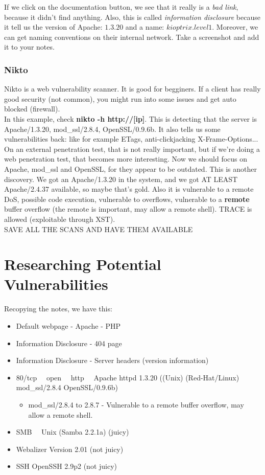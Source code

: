\documentclass[11pt,a4paper]{article}
\begin{document}
If we click on the documentation button, we see that it really is a \textit{bad link}, because it didn't find anything. Also, this is called \textit{information disclosure} because it tell us the version of Apache: $1.3.20$ and a name: $kioptrix.level1$. Moreover, we can get naming conventions on their internal network. Take a screenshot and add it to your notes.

\subsubsection{Nikto}
Nikto is a web vulnerability scanner. It is good for begginers. If a client has really good security (not common), you might run into some issues and get auto blocked (firewall).\\

In this example, check \textbf{nikto -h http://[ip]}. This is detecting that the server is Apache/1.3.20, mod\_ssl/2.8.4, OpenSSL/0.9.6b. It also tells us some vulnerabilities back: like for example ETags, anti-clickjacking X-Frame-Options... On an external penetration test, that is not really important, but if we're doing a web penetration test, that becomes more interesting. Now we should focus on Apache, mod\_ssl and OpenSSL, for they appear to be outdated. This is another discovery. We got an Apache/1.3.20 in the system, and we got AT LEAST Apache/2.4.37 available, so maybe that's gold. Also it is vulnerable to a remote DoS, possible code execution, vulnerable to overflows, vulnerable to a \textbf{remote} buffer overflow (the remote is important, may allow a remote shell). TRACE is allowed (exploitable through XST).\\

SAVE ALL THE SCANS AND HAVE THEM AVAILABLE

\section{Researching Potential Vulnerabilities}
Recopying the notes, we have this:
\begin{itemize}
\item Default webpage - Apache - PHP
\item Information Disclosure - 404 page
\item Information Disclosure - Server headers (version information)\\
\end{itemize}

\begin{itemize}
\item 80/tcp \ \ open \ \ http \ \ Apache httpd 1.3.20 ((Unix) (Red-Hat/Linux) mod\_ssl/2.8.4 OpenSSL/0.9.6b)
\begin{itemize}
\item mod\_ssl/2.8.4 to 2.8.7 - Vulnerable to a remote buffer overflow, may allow a remote shell.
\end{itemize}
\item SMB \ \ Unix (Samba 2.2.1a) (juicy)
\item Webalizer Version 2.01 (not juicy)
\item SSH OpenSSH 2.9p2 (not juicy)
\end{itemize}
\end{document}
